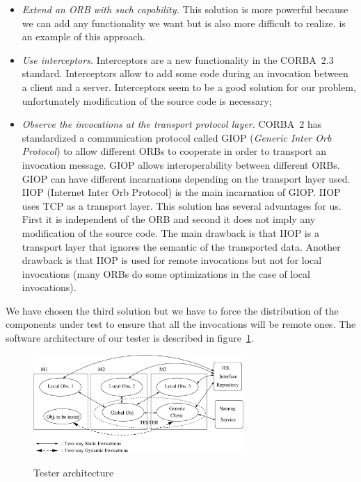 \begin{itemize}
  \item \emph{Extend an ORB with such capability.} This solution is more
        powerful because we can add any functionality we want but is
        also more difficult to realize. \cite{geib99} is an example of
        this approach. 

  \item \emph{Use interceptors.} Interceptors are a new functionality
        in the CORBA~2.3 standard. Interceptors allow to add some code
        during an invocation between a client and a
        server. Interceptors seem to be a good solution for our
        problem, unfortunately modification of the source code is
        necessary;

  \item \emph{Observe the invocations at the transport protocol
        layer.} CORBA~2 has standardized a communication protocol
        called GIOP (\emph{Generic Inter Orb Protocol}) to allow
        different ORBs to cooperate in order to transport an
        invocation message. GIOP allows interoperability between
        different ORBs. GIOP can have different incarnations depending
        on the transport layer used. IIOP (Internet Inter Orb
        Protocol) is the main incarnation of GIOP. IIOP uses TCP as a
        transport layer. This solution has several advantages for
        us. First it is independent of the ORB and second it does not
        imply any modification of the source code. The main drawback
        is that IIOP is a transport layer that ignores the semantic of
        the transported data. Another drawback is that IIOP is used
        for remote invocations but not for local invocations (many
        ORBs do some optimizations in the case of local invocations).
\end{itemize}

We have chosen the third solution but we have to force the distribution of
the components under test to ensure that all the invocations will be remote
ones. The software architecture of our tester is described
in figure~\ref{test_archi}.

\begin{figure}[htbp]
\centering
\centerline{\includegraphics[width=8cm]{new_test_arch.eps}}
\caption{Tester architecture}
\protect\label{test_archi}
\end{figure}

